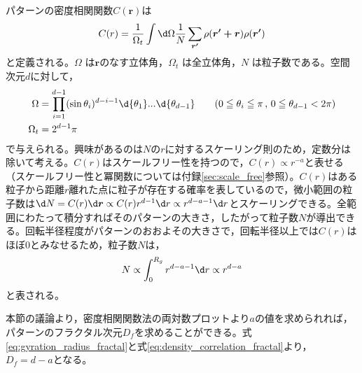 \documentclass[autodetect-engine,dvi=dvipdfmx,a4paper,ja=standard,oneside,openany,11pt]{bxjsbook}
\begin{document}
パターンの密度相関関数$C(\bm{r})$は
\begin{equation}
  C(r)=\frac{1}{\Omega_t}\int \d\Omega \frac{1}{N}\sum_{{\bm{r'}}}\rho(\bm{r'+ r})\rho({\bm{r'}})
  \label{eq:density_correlation}
\end{equation}
と定義される。$\Omega$ は$\bm{r}$のなす立体角，$\Omega_t$ は全立体角，$N$ は粒子数である。空間次元$d$に対して，
\begin{equation}
  \begin{aligned}
    \Omega   & =\prod^{d-1}_{i=1} (\sin\theta_i)^{d-i-1} \d{\theta_1}...\d{\theta_{d-1}} \qquad(0\leqq \theta_i\leqq \pi\,,\,0\leqq\theta_{d-1}<2\pi) \\
    \Omega_t & =2^{d-1}\pi
  \end{aligned}
  \label{eq:omega}
\end{equation}
で与えられる。興味があるのは$N$の$r$に対するスケーリング則のため，定数分は除いて考える。$C(r)$はスケールフリー性を持つので，$C(r)\propto r^{-a}$と表せる（スケールフリー性と冪関数については付録\ref{sec:scale_free}参照）。$C(r)$はある粒子から距離$r$離れた点に粒子が存在する確率を表しているので，微小範囲の粒子数は$\d N=C(r)\d \bm{r}\propto C(r)r^{d-1}\d r\propto r^{d-a-1} \d r $とスケーリングできる。全範囲にわたって積分すればそのパターンの大きさ，したがって粒子数$N$が導出できる。回転半径程度がパターンのおおよその大きさで，回転半径以上では$C(r)$はほぼ0とみなせるため，粒子数$N$は，
\begin{equation}
  N\propto \int_{0}^{R_g} r^{d-a-1} \d r\propto r^{d-a}
  \label{eq:density_correlation_fractal}
\end{equation}
と表される。

本節の議論より，密度相関関数法の両対数プロットより$a$の値を求められれば，パターンのフラクタル次元$D_f$を求めることができる。式\eqref{eq:gyration_radius_fractal}と式\eqref{eq:density_correlation_fractal}より，$D_f=d-a$となる。


\ifdraft{
  
  
}{}
\end{document}

